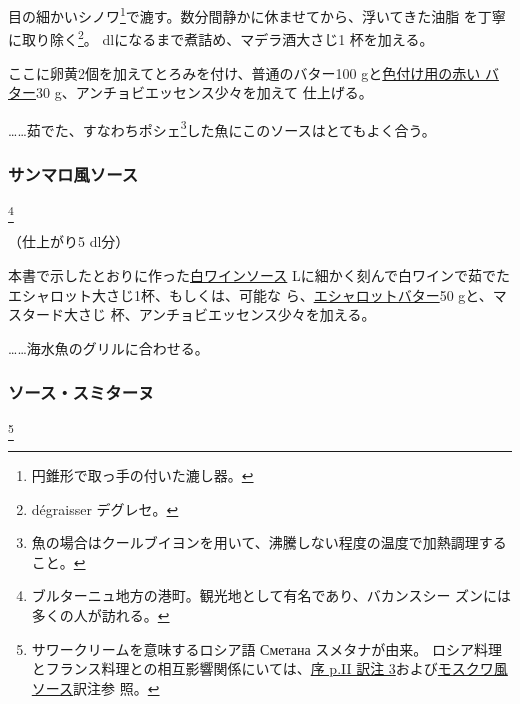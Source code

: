 \begin{recette}
目の細かいシノワ\footnote{円錐形で取っ手の付いた漉し器。}で漉す。数分間静かに休ませてから、浮いてきた油脂
を丁寧に取り除く\footnote{dégraisser デグレセ。}。\undemi{}
dlになるまで煮詰め、マデラ酒大さじ1 杯を加える。

ここに卵黄2個を加えてとろみを付け、普通のバター100
gと\protect\hyperlink{beurre-colorant-rouge}{色付け用の赤い バター}30
g、アンチョビエッセンス少々を加えて 仕上げる。

\ldots{}\ldots{}茹でた、すなわちポシェ\footnote{魚の場合はクールブイヨンを用いて、沸騰しない程度の温度で加熱調理すること。}した魚にこのソースはとてもよく合う。

\maeaki

\hypertarget{sauce-saint-malo}{%
\subsubsection{サンマロ風ソース}\label{sauce-saint-malo}}

\footnote{ブルターニュ地方の港町。観光地として有名であり、バカンスシー
  ズンには多くの人が訪れる。}


（仕上がり5 dl分）

本書で示したとおりに作った\protect\hyperlink{sauce-vin-blanc}{白ワインソース}\undemi{}
Lに細かく刻んで白ワインで茹でたエシャロット大さじ1杯、もしくは、可能な
ら、\protect\hyperlink{beurre-d-echalote}{エシャロットバター}50
gと、マスタード大さじ \undemi{}杯、アンチョビエッセンス少々を加える。

\ldots{}\ldots{}海水魚のグリルに合わせる。

\maeaki

\hypertarget{sauce-smitane}{%
\subsubsection{ソース・スミターヌ}\label{sauce-smitane}}

\footnote{サワークリームを意味するロシア語
   Сметана
  スメタナが由来。
  ロシア料理とフランス料理との相互影響関係にいては、\protect\hyperlink{service-russe}{序
  p.II 訳注
  3}および\protect\hyperlink{sauce-moscovite}{モスクワ風ソース}訳注参
  照。}


\end{recette}
